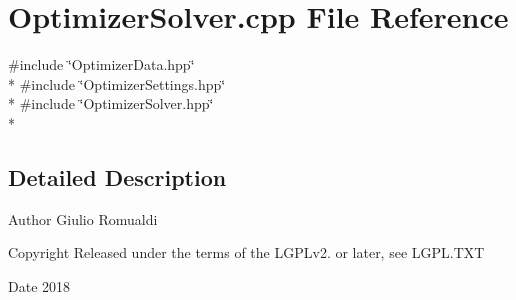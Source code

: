 \section{Optimizer\+Solver.\+cpp File Reference}
\label{OptimizerSolver_8cpp}
{\ttfamily \#include \char`\"{}Optimizer\+Data.\+hpp\char`\"{}}\\*
{\ttfamily \#include \char`\"{}Optimizer\+Settings.\+hpp\char`\"{}}\\*
{\ttfamily \#include \char`\"{}Optimizer\+Solver.\+hpp\char`\"{}}\\*


\subsection{Detailed Description}
\begin{DoxyAuthor}{Author}
Giulio Romualdi 
\end{DoxyAuthor}
\begin{DoxyCopyright}{Copyright}
Released under the terms of the L\+G\+P\+Lv2. or later, see L\+G\+P\+L.\+T\+XT 
\end{DoxyCopyright}
\begin{DoxyDate}{Date}
2018 
\end{DoxyDate}
